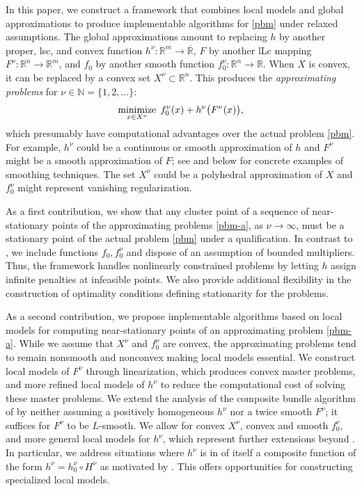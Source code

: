 \documentclass[smallextended,envcountsect]{svjour3}
\newcommand{\nats}{\mathbb{N}}
\newcommand{\reals}{\mathbb{R}}
\newcommand{\Reals}{\overline{\mathbb{R}}}
\newcommand{\nnmin}{\mathop{\rm minimize}}
\begin{document}
In this paper, we construct a framework that combines local models and global approximations to produce implementable algorithms for \eqref{pbm} under relaxed assumptions. The global approximations amount to replacing $h$ by another proper, lsc, and convex function $h^\nu:\reals^m\to \Reals$, $F$ by another lLc mapping $F^\nu:\reals^n\to \reals^m$, and $f_0$ by another smooth function $f_0^\nu:\reals^n\to \reals$. When $X$ is  convex, it can be replaced by a convex set $X^\nu\subset\reals^n$. This produces the \emph{approximating problems} for $\nu\in \nats = \{1, 2, \dots\}$:
\begin{equation}\label{pbm-a}
\nnmin_{x\in X^\nu}\; f_0^\nu(x) + h^\nu\big(F^\nu(x)\big),
\end{equation}
which presumably have computational advantages over the actual problem \eqref{pbm}. For example, $h^\nu$ could be a continuous or smooth approximation of $h$ and $F^\nu$ might be a smooth approximation of $F$; see \cite{ErmolievNorkinWets.95,ChenMangasarian.95,Chen.12,BurkeHoheisel.13,BurkeHoheisel.17} and below for concrete examples of smoothing techniques. The set $X^\nu$ could be a polyhedral approximation of $X$ and $f_0^\nu$ might represent vanishing regularization. 

As a first contribution, we show that any cluster point of a sequence of near-stationary points of the approximating problems \eqref{pbm-a}, as $\nu\to \infty$, must be a stationary point of the actual problem \eqref{pbm} under a qualification. In contrast to \cite{Royset2023a}, we include functions $f_0,f_0^\nu$ and dispose of an assumption of bounded multipliers. Thus, the framework handles nonlinearly constrained problems by letting $h$ assign infinite penalties at infeasible points. We also provide additional flexibility in the construction of optimality conditions defining stationarity for the problems. 

As a second contribution, we propose implementable algorithms based on local models for computing near-stationary points of an approximating problem \eqref{pbm-a}. While we assume that $X^\nu$ and $f_0^\nu$ are convex, the approximating problems tend to remain nonsmooth and nonconvex making local models essential. We construct local models of $F^\nu$ through linearization, which produces convex master problems, and more refined local models of $h^\nu$ to reduce the computational cost of solving these master problems. We extend the analysis of the composite bundle algorithm of \cite{Sagastizabal_2013} by neither assuming a positively homogeneous $h^\nu$ nor a twice smooth $F^\nu$; it suffices for $F^\nu$ to be $L$-smooth. We allow for convex $X^\nu$, convex and smooth $f_0^\nu$, and more general local models for $h^\nu$, which represent further extensions beyond \cite{Sagastizabal_2013}. In particular, we address situations where $h^\nu$ is in of itself a composite function of the form $h^\nu = h_0^\nu \circ H^\nu$ as motivated by \cite{Ferris_Huber_Royset_2024}. This offers opportunities for constructing specialized local models. 
\end{document}
